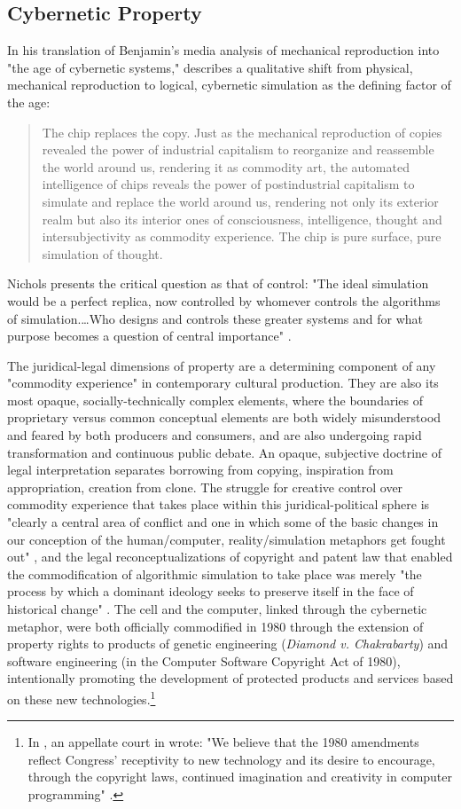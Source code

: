 \subsection*{Cybernetic Property}
In his translation of Benjamin's media analysis of mechanical reproduction into "the age of cybernetic systems," \citeauthor{Nichols1988} describes a qualitative shift from physical, mechanical reproduction to logical, cybernetic simulation as the defining factor of the age:
\blockcquote[33]{Nichols1988}{
  The chip replaces the copy. Just as the mechanical reproduction of copies revealed the power of industrial capitalism to reorganize and reassemble the world around us, rendering it as commodity art, the automated intelligence of chips reveals the power of postindustrial capitalism to simulate and replace the world around us, rendering not only its exterior realm but also its interior ones of consciousness, intelligence, thought and intersubjectivity as commodity experience. The chip is pure surface, pure simulation of thought.
}
Nichols presents the critical question as that of control: "The ideal simulation would be a perfect replica, now controlled by whomever controls the algorithms of simulation.…Who designs and controls these greater systems and for what purpose becomes a question of central importance" \autocite[34--5]{Nichols1988}.

The juridical-legal dimensions of property are a determining component of any "commodity experience" in contemporary cultural production. They are also its most opaque, socially-technically complex elements, where the boundaries of proprietary versus common conceptual elements are both widely misunderstood and feared by both producers and consumers, and are also undergoing rapid transformation and continuous public debate. An opaque, subjective doctrine of legal interpretation separates borrowing from copying, inspiration from appropriation, creation from clone. The struggle for creative control over commodity experience that takes place within this juridical-political sphere is "clearly a central area of conflict and one in which some of the basic changes in our conception of the human/computer, reality/simulation metaphors get fought out" \autocite[38]{Nichols1988}, and the legal reconceptualizations of copyright and patent law that enabled the commodification of algorithmic simulation to take place was merely "the process by which a dominant ideology seeks to preserve itself in the face of historical change" \autocite[38]{Nichols1988}. The cell and the computer, linked through the cybernetic metaphor, were both officially commodified in 1980 through the extension of property rights to products of genetic engineering (\emph{Diamond v. Chakrabarty}) and software engineering (in the Computer Software Copyright Act of 1980), intentionally promoting the development of protected products and services based on these new technologies.\footnote{
  In \citeyear{apple-franklin}, an appellate court in  wrote: "We believe that the 1980 amendments reflect Congress' receptivity to new technology and its desire to encourage, through the copyright laws, continued imagination and creativity in computer programming" \autocite*[1253--4]{apple-franklin}.
}

